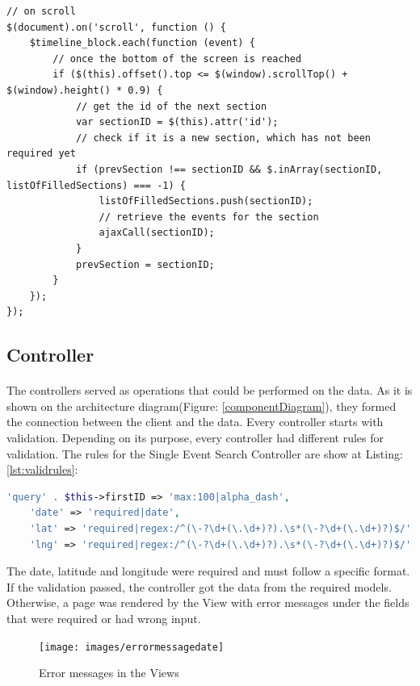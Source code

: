 \documentclass{l4proj}
\begin{document}
\begin{lstlisting}[caption={Infinite scrolling},label={lst:infinite}]
// on scroll
$(document).on('scroll', function () {
	$timeline_block.each(function (event) {
		// once the bottom of the screen is reached
		if ($(this).offset().top <= $(window).scrollTop() + $(window).height() * 0.9) {
			// get the id of the next section
			var sectionID = $(this).attr('id');
			// check if it is a new section, which has not been required yet
			if (prevSection !== sectionID && $.inArray(sectionID, listOfFilledSections) === -1) {
				listOfFilledSections.push(sectionID);
				// retrieve the events for the section
				ajaxCall(sectionID);
			}
			prevSection = sectionID;
		}
	});
});
\end{lstlisting}

\subsection{Controller}
\label{subsec:controller}
\paragraph{}
The controllers served as operations that could be performed on the data. As it is shown on the architecture diagram(Figure: \ref{componentDiagram}), they formed the connection between the client and the data. Every controller starts with validation. Depending on its purpose, every controller had different rules for validation.
The rules for the Single Event Search Controller are show at Listing: \ref{lst:validrules}:
\begin{lstlisting}[caption={Validation Rules},label={lst:validrules},language=PHP]
    'query' . $this->firstID => 'max:100|alpha_dash',
    'date' => 'required|date',
    'lat' => 'required|regex:/^(\-?\d+(\.\d+)?).\s*(\-?\d+(\.\d+)?)$/',
    'lng' => 'required|regex:/^(\-?\d+(\.\d+)?).\s*(\-?\d+(\.\d+)?)$/',
\end{lstlisting}
The date, latitude and longitude were required and must follow a specific format. If the validation passed, the controller got the data from the required models. Otherwise, a page was rendered by the View with error messages under the fields that were required or had wrong input. 

\begin{figure}[H]
	\centering
	\texttt{[image: images/errormessagedate]}
	\label{errormessagedate}
	\caption{Error messages in the Views}
\end{figure}
\end{document}
